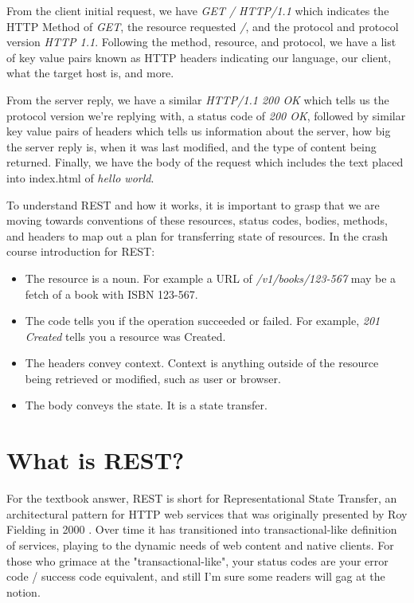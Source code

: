 From the client initial request, we have \textit{GET / HTTP/1.1} which indicates the HTTP Method of \textit{GET}, the resource requested \textit{/}, and the protocol and protocol version \textit{HTTP 1.1}.  Following the method, resource, and protocol, we have a list of key value pairs known as HTTP headers indicating our language, our client, what the target host is, and more.

From the server reply, we have a similar \textit{HTTP/1.1 200 OK} which tells us the protocol version we're replying with, a status code of \textit{200 OK}, followed by similar key value pairs of headers which tells us information about the server, how big the server reply is, when it was last modified, and the type of content being returned.  Finally, we have the body of the request which includes the text placed into index.html of \textit{hello world}.

To understand REST and how it works, it is important to grasp that we are moving towards conventions of these resources, status codes, bodies, methods, and headers to map out a plan for transferring state of resources.  In the crash course introduction for REST:
\begin{itemize}
  \item The resource is a noun.  For example a URL of \textit{/v1/books/123-567} may be a fetch of a book with ISBN 123-567.
  \item The code tells you if the operation succeeded or failed.  For example, \textit{201 Created} tells you a resource was Created.
  \item The headers convey context.  Context is anything outside of the resource being retrieved or modified, such as user or browser.
  \item The body conveys the state.  It is a state transfer.
\end{itemize}

\section{What is REST?}

For the textbook answer, REST is short for Representational State Transfer, an architectural pattern for HTTP web services that was originally presented by Roy Fielding in 2000 \cite{fielding}.  Over time it has transitioned into transactional-like definition of services, playing to the dynamic needs of web content and native clients.  For those who grimace at the "transactional-like", your status codes are your error code / success code equivalent, and still I'm sure some readers will gag at the notion.

